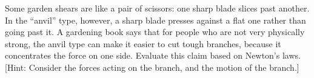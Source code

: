  Some garden shears are like a pair of scissors: one sharp
blade slices past another. In the ``anvil'' type, however, a
sharp blade presses against a flat one rather than going
past it. A gardening book says that for people who are not
very physically strong, the anvil type can make it easier to
cut tough branches, because it concentrates the force on one
side. Evaluate this claim based on Newton's laws. [Hint:
Consider the forces acting on the branch, and the motion of the branch.]
